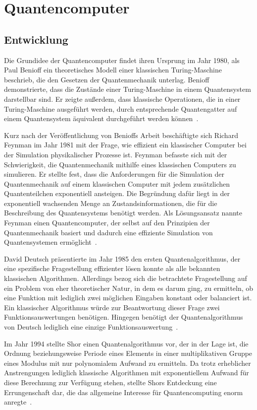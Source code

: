 \section{Quantencomputer}
\subsection{Entwicklung} 
Die Grundidee der Quantencomputer findet ihren Ursprung im Jahr 1980, 
als Paul Benioff ein theoretisches Modell einer klassischen Turing-Maschine beschrieb, 
die den Gesetzen der Quantenmechanik unterlag.
Benioff demonstrierte, dass die Zustände einer Turing-Maschine in einem Quantensystem darstellbar sind. 
Er zeigte außerdem, dass klassische Operationen, die in einer Turing-Maschine ausgeführt werden, 
durch entsprechende Quantengatter auf einem Quantensystem äquivalent durchgeführt werden können~\cite{benioff1980}.

Kurz nach der Veröffentlichung von Benioffs Arbeit beschäftigte sich Richard Feynman im Jahr 1981 mit der Frage,
wie effizient ein klassischer Computer bei der Simulation physikalischer Prozesse ist.
Feynman befasste sich mit der Schwierigkeit, die Quantenmechanik mithilfe eines klassischen Computers zu simulieren.
Er stellte fest, dass die Anforderungen für die Simulation der Quantenmechanik auf einem klassischen Computer mit jedem zusätzlichen Quantenteilchen exponentiell ansteigen.
Die Begründung dafür liegt in der exponentiell wachsenden Menge an Zustandsinformationen,
die für die Beschreibung des Quantensystems benötigt werden.
Als Lösungsansatz nannte Feynman einen Quantencomputer, 
der selbst auf den Prinzipien der Quantenmechanik basiert und dadurch eine effiziente Simulation von Quantensystemen ermöglicht~\cite{Feynman1982}.

David Deutsch präsentierte im Jahr 1985 den ersten Quantenalgorithmus, 
der eine spezifische Fragestellung effizienter lösen konnte als alle bekannten klassischen Algorithmen. 
Allerdings bezog sich die betrachtete Fragestellung auf ein Problem von eher theoretischer Natur, 
in dem es darum ging, 
zu ermitteln, ob eine Funktion mit lediglich zwei möglichen Eingaben konstant oder balanciert ist.
Ein klassischer Algorithmus würde zur Beantwortung dieser Frage zwei Funktionsauswertungen benötigen. 
Hingegen benötigt der Quantenalgorithmus von Deutsch  
lediglich eine einzige Funktionsauswertung~\cite{deutsch1985}.

Im Jahr 1994 stellte Shor einen Quantenalgorithmus vor, der in der Lage ist, 
die Ordnung beziehungsweise Periode eines Elements in einer multiplikativen Gruppe eines Modulus mit nur polynomialem Aufwand zu ermitteln. 
Da trotz erheblicher Anstrengungen lediglich klassische Algorithmen mit exponentiellem Aufwand für diese Berechnung zur Verfügung stehen, 
stellte Shors Entdeckung eine Errungenschaft dar, die das allgemeine Interesse für Quantencomputing enorm anregte~\cite{Shor_1997}.

